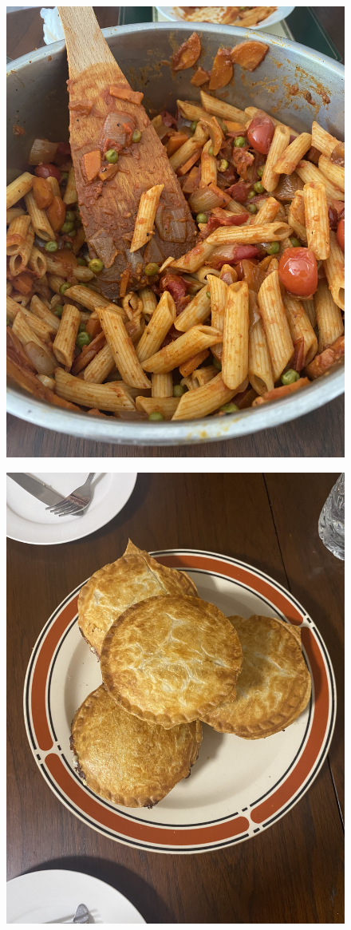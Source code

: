 \documentclass[]{article}
\begin{document}
\newpage\begin{figure}[H]
\begin{center}\hyperref[rec:Red Sauce Rigatoni]{\includegraphics[keepaspectratio,width=\textheight,height=\textwidth,angle=-90]{Gallery/Red Sauce Rigatoni}}\caption*{}\label{fig:Red Sauce Rigatoni}\end{center}
\end{figure}
\newpage\begin{figure}[H]
\begin{center}\hyperref[rec:Bechamel Pie]{\includegraphics[keepaspectratio,width=\textheight,height=\textwidth,angle=-90]{Gallery/Bechamel Pie}}\caption*{}\label{fig:Bechamel Pie}\end{center}
\end{figure}
\end{document}

